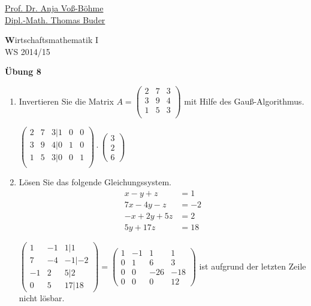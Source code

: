 \documentclass[12pt,a4paper]{scrreprt}
\newcommand{\Lsg}{\textbf{Lsg.:}}
\begin{document}
 
\begin{flushleft}
\href{mailto:anja.voss-boehme@htw-dresden.de}{Prof. Dr. Anja Voß-Böhme} \\
\href{mailto:buder@htw-dresden.de}{Dipl.-Math. Thomas Buder}
\end{flushleft}

\begin{center}{\large\textbf Wirtschaftsmathematik I} \\ WS 2014/15 \end{center}

\begin{center}{\large\bf Übung 8 } 
\end{center}


\bigskip
\begin{enumerate}
	\item Invertieren Sie die Matrix
$A=\begin{pmatrix}
 2 & 7 & 3\\
 3 & 9 & 4 \\
 1 & 5 & 3\\
\end{pmatrix}$ mit Hilfe des Gauß-Algorithmus.

$
\begin{pmatrix}
 2 & 7 & 3 \vert 1 & 0 & 0 \\
 3 & 9 & 4 \vert 0 & 1 & 0 \\
 1 & 5 & 3 \vert 0 & 0 & 1 \\
\end{pmatrix}\cdot\begin{pmatrix} 3 \\ 2 \\ 6 \end{pmatrix}
$

	\item Lösen Sie das folgende Gleichungssystem.\begin{align*}
x - y +  z &= 1 \\
7x - 4y - z &= -2\\
-x + 2y + 5z &= 2\\
5y + 17z &= 18
\end{align*}

$
\begin{pmatrix}
1	&	-1	&	1	|	1	\\
7	&	-4	&	-1	|	-2	\\
-1	&	2	&	5	|	2	\\
0	&	5	&	17	|	18
\end{pmatrix}
=
\begin{pmatrix}
1	&	-1	&	1	&	1	\\
0	&	1	&	6	&	3	\\
0	&	0	&	-26	&	-18	\\
0	&	0	&	0	&	12
\end{pmatrix}
$ ist aufgrund der letzten Zeile nicht lösbar.


\end{enumerate}
\end{document}
